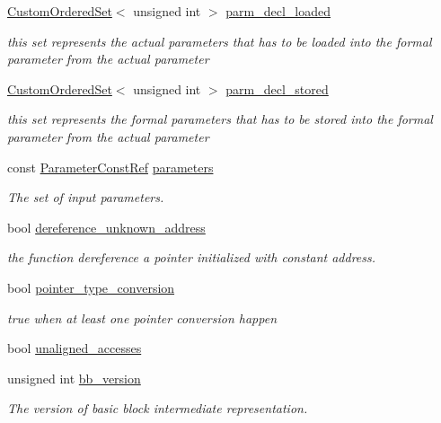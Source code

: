 \begin{DoxyCompactItemize}
\hyperlink{classCustomOrderedSet}{Custom\+Ordered\+Set}$<$ unsigned int $>$ \hyperlink{classFunctionBehavior_a0cb55ed9106b19c05297c138c2c97ffc}{parm\+\_\+decl\+\_\+loaded}
\begin{DoxyCompactList}\small\item\em this set represents the actual parameters that has to be loaded into the formal parameter from the actual parameter \end{DoxyCompactList}\item 
\hyperlink{classCustomOrderedSet}{Custom\+Ordered\+Set}$<$ unsigned int $>$ \hyperlink{classFunctionBehavior_ae2419c4d1cf793c728843c68c267ee8b}{parm\+\_\+decl\+\_\+stored}
\begin{DoxyCompactList}\small\item\em this set represents the formal parameters that has to be stored into the formal parameter from the actual parameter \end{DoxyCompactList}\item 
const \hyperlink{Parameter_8hpp_a37841774a6fcb479b597fdf8955eb4ea}{Parameter\+Const\+Ref} \hyperlink{classFunctionBehavior_a8a568943fd66b40da9b58df7d3fc4da0}{parameters}
\begin{DoxyCompactList}\small\item\em The set of input parameters. \end{DoxyCompactList}\item 
bool \hyperlink{classFunctionBehavior_aafd6bd17fce8602e186da5c96b40d422}{dereference\+\_\+unknown\+\_\+address}
\begin{DoxyCompactList}\small\item\em the function dereference a pointer initialized with constant address. \end{DoxyCompactList}\item 
bool \hyperlink{classFunctionBehavior_a4c771cb0eb670e5ed967aa48cf0c9af4}{pointer\+\_\+type\+\_\+conversion}
\begin{DoxyCompactList}\small\item\em true when at least one pointer conversion happen \end{DoxyCompactList}\item 
bool \hyperlink{classFunctionBehavior_a062d9b8d97d2d023acf71bbe6e7f080b}{unaligned\+\_\+accesses}
\item 
unsigned int \hyperlink{classFunctionBehavior_a11bef5db9582106abc6aef23183af306}{bb\+\_\+version}
\begin{DoxyCompactList}\small\item\em The version of basic block intermediate representation. \end{DoxyCompactList}\item 

\end{DoxyCompactItemize}
